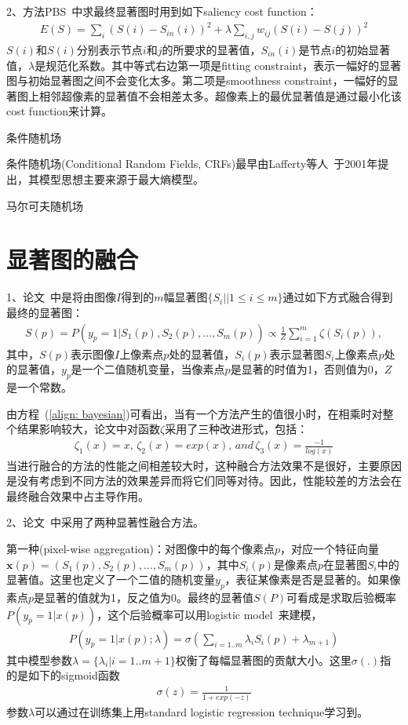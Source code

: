 \documentclass[12pt]{article}
\begin{document}
2、方法PBS~\cite{yang2013graph}中求最终显著图时用到如下saliency cost function：
\begin{align}
E(S) = \sum_i(S(i)-S_{in}(i))^2+\lambda\sum_{i,j}w_{ij}(S(i)-S(j))^2
\end{align}
$S(i)$和$S(i)$分别表示节点$i$和$j$的所要求的显著值，$S_{in}(i)$是节点$i$的初始显著值，$\lambda$是规范化系数。其中等式右边第一项是fitting constraint，表示一幅好的显著图与初始显著图之间不会变化太多。第二项是smoothness constraint，一幅好的显著图上相邻超像素的显著值不会相差太多。超像素上的最优显著值是通过最小化该cost function来计算。

条件随机场

条件随机场(Conditional Random Fields, CRFs)最早由Lafferty等人~\cite{lafferty2001conditional}于2001年提出，其模型思想主要来源于最大熵模型。


马尔可夫随机场

\section{显著图的融合}

1、论文~\cite{borji2012salient}中是将由图像$I$得到的$m$幅显著图$\{S_i||1 \le i \le m \}$通过如下方式融合得到最终的显著图：
\begin{align}
S(p) = P(y_p=1|S_1(p), S_2(p), \ldots, S_m(p))\propto \frac{1}{Z} \sum_{i=1}^{m} \zeta(S_i(p)), 
\label{align: bayesian}
\end{align}
其中，$S(p)$表示图像$I$上像素点$p$处的显著值，$S_i(p)$表示显著图$S_i$上像素点$p$处的显著值，$y_p$是一个二值随机变量，当像素点$p$是显著的时值为1，否则值为0，$Z$是一个常数。

由方程~(\ref{align: bayesian})可看出，当有一个方法产生的值很小时，在相乘时对整个结果影响较大，论文中对函数$\zeta$采用了三种改进形式，包括：
\begin{align}
\zeta_1(x) = x, \, \zeta_2(x) = exp(x), \,and \, \zeta_3(x) = \frac{-1}{log(x)}
\end{align}
当进行融合的方法的性能之间相差较大时，这种融合方法效果不是很好，主要原因是没有考虑到不同方法的效果差异而将它们同等对待。因此，性能较差的方法会在最终融合效果中占主导作用。

2、论文~\cite{mai2013saliency}中采用了两种显著性融合方法。

第一种(pixel-wise aggregation)：对图像中的每个像素点$p$，对应一个特征向量$\textbf{x}(p) = (S_1(p), S_2(p), \ldots, S_m(p))$，其中$S_i(p)$是像素点$p$在显著图$S_i$中的显著值。这里也定义了一个二值的随机变量$y_p$，表征某像素是否是显著的。如果像素点$p$是显著的值就为1，反之值为0。最终的显著值$S(P)$可看成是求取后验概率$P(y_p = 1|x(p))$，这个后验概率可以用logistic model~\cite{bishop2006pattern}来建模，
\begin{align}
P(y_p=1|x(p);\lambda)=\sigma(\sum_{i=1..m}\lambda_i S_i(p)+\lambda_{m+1})
\end{align}
其中模型参数$\lambda = \{\lambda_i|i=1..m+1\}$权衡了每幅显著图的贡献大小。这里$\sigma(.)$指的是如下的sigmoid函数
\begin{align}
\sigma(z) = \frac{1}{1+exp(-z)}
\end{align}
参数$\lambda$可以通过在训练集上用standard logistic regression technique学习到。
\end{document}
